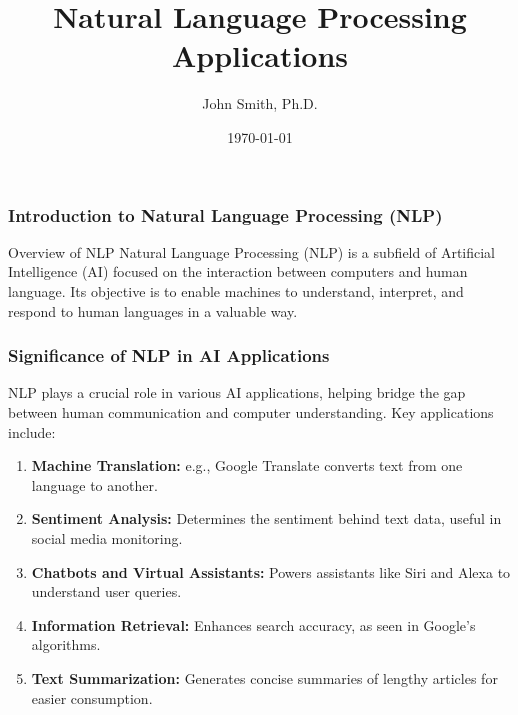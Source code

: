 \documentclass[aspectratio=169]{beamer}
\title[Week 5 NLP]{Natural Language Processing Applications}
\author[J. Smith]{John Smith, Ph.D.}
\institute[University Name]{
  Department of Computer Science\\
  University Name\\
  \vspace{0.3cm}
  Email: email@university.edu\\
  Website: www.university.edu
}
\date{\today}
\begin{document}
\frame{\titlepage}

\begin{frame}[fragile]
    \frametitle{Introduction to Natural Language Processing (NLP)}
    \begin{block}{Overview of NLP}
        Natural Language Processing (NLP) is a subfield of Artificial Intelligence (AI) focused on the interaction between computers and human language. Its objective is to enable machines to understand, interpret, and respond to human languages in a valuable way.
    \end{block}
\end{frame}

\begin{frame}[fragile]
    \frametitle{Significance of NLP in AI Applications}
    NLP plays a crucial role in various AI applications, helping bridge the gap between human communication and computer understanding. Key applications include:
    
    \begin{enumerate}
        \item \textbf{Machine Translation:} e.g., Google Translate converts text from one language to another.
        \item \textbf{Sentiment Analysis:} Determines the sentiment behind text data, useful in social media monitoring.
        \item \textbf{Chatbots and Virtual Assistants:} Powers assistants like Siri and Alexa to understand user queries.
        \item \textbf{Information Retrieval:} Enhances search accuracy, as seen in Google's algorithms.
        \item \textbf{Text Summarization:} Generates concise summaries of lengthy articles for easier consumption.
    \end{enumerate}
\end{frame}
\end{document}
